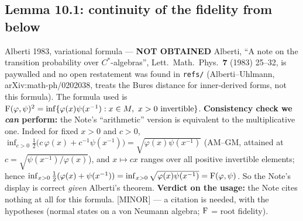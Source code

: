 \documentclass[11pt]{article}
\begin{document}
\subsection{Lemma 10.1: continuity of the fidelity from below}

\begin{citedbox}{Alberti 1983, variational formula --- \textbf{NOT OBTAINED}}
Alberti, ``A note on the transition probability over $C^*$-algebras'', Lett.\
Math.\ Phys.\ \textbf{7} (1983) 25--32, is paywalled and no open restatement was
found in \texttt{refs/} (Alberti--Uhlmann, arXiv:math-ph/0202038, treats the
Bures distance for inner-derived forms, not this formula). The formula used is
$\operatorname{F}(\varphi,\psi)^2=\inf\{\varphi(x)\psi(x^{-1}):x\in M,\ x>0\text{ invertible}\}$.
\textbf{Consistency check we \emph{can} perform:} the Note's ``arithmetic''
version is equivalent to the multiplicative one. Indeed for fixed $x>0$ and
$c>0$, $\inf_{c>0}\frac12\bigl(c\,\varphi(x)+c^{-1}\psi(x^{-1})\bigr)
=\sqrt{\varphi(x)\psi(x^{-1})}$ (AM--GM, attained at
$c=\sqrt{\psi(x^{-1})/\varphi(x)}$), and $x\mapsto cx$ ranges over all positive
invertible elements; hence
$\inf_{x>0}\frac12(\varphi(x)+\psi(x^{-1}))=\inf_{x>0}\sqrt{\varphi(x)\psi(x^{-1})}=\operatorname{F}(\varphi,\psi)$.
So the Note's display is correct \emph{given} Alberti's theorem.
\textbf{Verdict on the usage:} the Note cites nothing at all for this formula.
[MINOR] --- a citation is needed, with the hypotheses (normal states on a von
Neumann algebra; $\operatorname{F}$ = root fidelity).
\end{citedbox}
\end{document}
